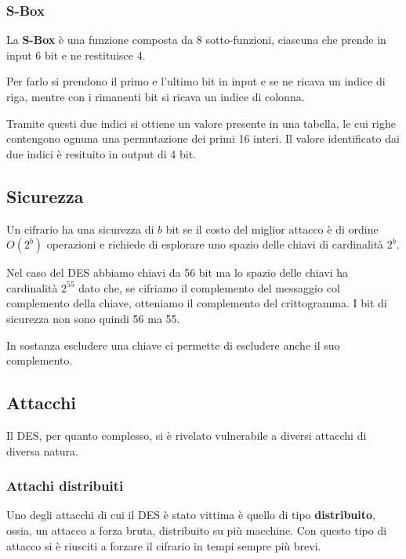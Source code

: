 \subsubsection{S-Box}
La \textbf{S-Box} \`e una funzione composta da 8 sotto-funzioni, ciascuna che prende in input 6 bit e ne restituisce
4.

Per farlo si prendono il primo e l'ultimo bit in input e se ne ricava un indice di riga, mentre con i rimanenti bit
si ricava un indice di colonna.

Tramite questi due indici si ottiene un valore presente in una tabella, le cui righe contengono ognuna una permutazione
dei primi 16 interi. Il valore identificato dai due indici \`e resituito in output di 4 bit.

\subsection{Sicurezza}\label{sicurezza_DES}
Un cifrario ha una sicurezza di $b$ bit se il costo del miglior attacco \`e di ordine $O(2^b)$ operazioni e richiede di
esplorare uno spazio delle chiavi di cardinalit\`a $2^b$.

Nel caso del DES abbiamo chiavi da 56 bit ma lo spazio delle chiavi ha cardinalit\`a $2^{55}$ dato che, se cifriamo
il complemento del messaggio col complemento della chiave, otteniamo il complemento del crittogramma. I bit di
sicurezza non sono quindi 56 ma 55.

In sostanza escludere una chiave ci permette di escludere anche il suo complemento.

\subsection{Attacchi}\label{attacchi_DES}
Il DES, per quanto complesso, si \`e rivelato vulnerabile a diversi attacchi di diversa natura.

\subsubsection{Attachi distribuiti}
Uno degli attacchi di cui il DES \`e stato vittima \`e quello di tipo \textbf{distribuito}, ossia, un attacco a
forza bruta, distribuito su pi\`u macchine. Con questo tipo di attacco si \`e riusciti a forzare il cifrario in tempi
sempre pi\`u brevi.


